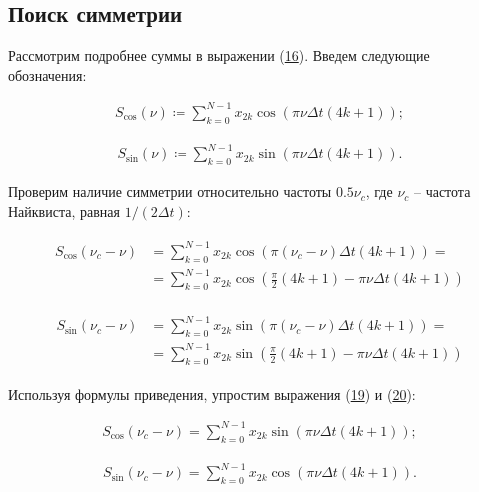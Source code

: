 \documentclass[12pt]{article}
\newcommand{\hl}[1]{(\hyperlink{eq:#1}{#1})}
\newcommand{\s}[2]{\hypertarget{skip:#1}{\vspace{#2pt}}}
\newcommand{\sd}[1]{\hypertarget{skip:#1}{\vspace{-10pt}}}
\newcommand{\hep}[2]{\vspace{#2pt}\hypertarget{eq:#1}{}\vspace{-#2pt}}
\begin{document}
\subsection{Поиск симметрии}

Рассмотрим подробнее суммы в выражении \hl{16}. Введем следующие обозначения:

\sd{17}
\begin{gather}
    S_{\cos}(\nu) \coloneqq \sum_{k = 0}^{N - 1} x_{2 k} \cos(\pi \nu \Delta t (4 k + 1));
\end{gather}

\sd{18}
\begin{gather}
    S_{\sin}(\nu) \coloneqq \sum_{k = 0}^{N - 1} x_{2 k} \sin(\pi \nu \Delta t (4 k + 1)).
\end{gather}

Проверим наличие симметрии относительно частоты $ 0.5 \nu_{c} $, где $ \nu_{c} $ -- частота Найквиста, равная $ 1 / (2 \Delta t) $:

\sd{19}\hep{19}{16.5}
\begin{gather}
    \begin{split}
    S_{\cos}(\nu_{c} - \nu) &= \sum_{k = 0}^{N - 1} x_{2 k} \cos(\pi (\nu_{c} - \nu) \Delta t (4 k + 1)) = \\
    &= \sum_{k = 0}^{N - 1} x_{2 k} \cos(\frac{\pi}{2} (4 k + 1) - \pi \nu \Delta t (4 k + 1))
    \end{split}
\end{gather}

\s{20}{-10}\hep{20}{6}
\begin{gather}
    \begin{split}
    S_{\sin}(\nu_{c} - \nu) &= \sum_{k = 0}^{N - 1} x_{2 k} \sin(\pi (\nu_{c} - \nu) \Delta t (4 k + 1)) = \\
    &= \sum_{k = 0}^{N - 1} x_{2 k} \sin(\frac{\pi}{2} (4 k + 1) - \pi \nu \Delta t (4 k + 1))
    \end{split}
\end{gather}

Используя формулы приведения, упростим выражения \hl{19} и \hl{20}:

\sd{21}
\begin{gather}
    S_{\cos}(\nu_{c} - \nu) = \sum_{k = 0}^{N - 1} x_{2 k} \sin(\pi \nu \Delta t (4 k + 1));
\end{gather}

\s{22}{-10}
\begin{gather}
    S_{\sin}(\nu_{c} - \nu) = \sum_{k = 0}^{N - 1} x_{2 k} \cos(\pi \nu \Delta t (4 k + 1)).
\end{gather}
\end{document}
